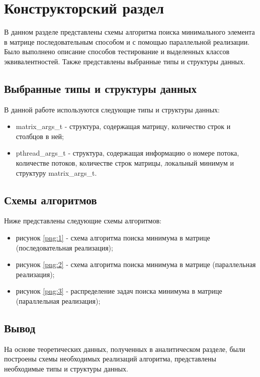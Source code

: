 \chapter{Конструкторский раздел}

В данном разделе представлены схемы алгоритма поиска минимального элемента в матрице последовательным способом и с помощью параллельной реализации. Было выполнено описание способов тестирование и выделенных классов эквивалентностей. Также представлены выбранные типы и структуры данных.

\section{Выбранные типы и структуры данных}
В данной работе используются следующие типы и структуры данных:
\begin{itemize}
	\item matrix\_args\_t - структура, содержащая матрицу, количество строк и столбцов в ней;
	\item pthread\_args\_t - структура, содержащая информацию о номере потока, количестве потоков, количестве строк матрицы, локальный минимум и структуру matrix\_args\_t.
\end{itemize}

\section{Схемы алгоритмов}
Ниже представлены следующие схемы алгоритмов:
\begin{itemize}
	\item рисунок \ref{png:1} - схема алгоритма поиска минимума в матрице (последовательная реализация);
	\begin{figure}[H]
	\end{figure}

	\newpage
	\item рисунок \ref{png:2} - схема алгоритма поиска минимума в матрице (параллельная реализация);
	\begin{figure}[H]
	\end{figure}

	\item рисунок \ref{png:3} - распределение задач поиска минимума в матрице (параллельная реализация);
	\begin{figure}[H]
	\end{figure}
\end{itemize}

\section{Вывод}
На основе теоретических данных, полученных в аналитическом разделе, были построены схемы необходимых реализаций алгоритма, представлены необходимые типы и структуры данных.